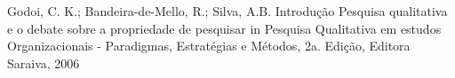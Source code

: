 \documentclass[
12pt,		%
openright,	%
twoside,  %
a4paper,			%
chapter=TITLE,		%
english,			%
french,				%
spanish,			%
brazil				%
]{USPSC-classe/USPSC}
\begin{document}
\begin{flushleft}
\begin{flushleft}
\begin{flushleft}
\begin{flushleft}
\begin{flushleft}
\begin{flushleft}
\begin{flushleft}
\begin{flushleft}
\begin{flushleft}
\begin{flushleft}
[GODOI et al., 2006] Godoi, C. K.; Bandeira-de-Mello, R.; Silva, A.B. Introdu\c{c}\~ao Pesquisa qualitativa e o debate sobre a propriedade de pesquisar in Pesquisa Qualitativa em estudos Organizacionais - Paradigmas, Estrat\'egias e M\'etodos, 2a. Edi\c{c}\~ao, Editora Saraiva, 2006
\end{flushleft}


\end{flushleft}


\end{flushleft}


\end{flushleft}


\end{flushleft}


\end{flushleft}


\end{flushleft}


\end{flushleft}


\end{flushleft}


\end{flushleft}
\end{document}
